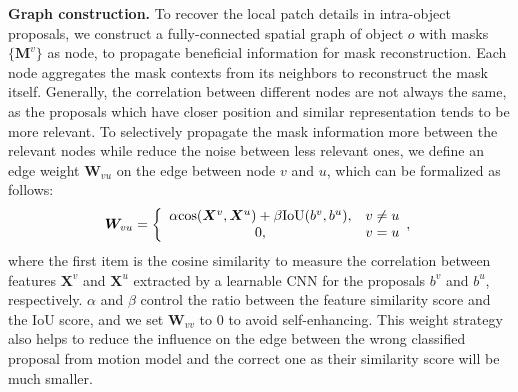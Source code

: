 \documentclass[letterpaper]{article} %
\begin{document}
\noindent \textbf{Graph construction.}
To recover the local patch details in intra-object proposals, we construct a fully-connected spatial graph of object $o$ with masks $\{\bm{M}^{v}\}$ as node, to propagate beneficial information for mask reconstruction. Each node aggregates the mask contexts from its neighbors to reconstruct the mask itself. Generally, the correlation between different nodes are not always the same, as the proposals which have closer position and similar representation tends to be more relevant.
To selectively propagate the mask information more between the relevant nodes while reduce the noise between less relevant ones, we define an edge weight $\bm{W}_{vu}$ on the edge between node $v$ and $u$, which can be formalized as follows:
\begin{equation}
    \bm{W}_{vu} = \left\{
             \begin{array}{cl}
              \alpha {\rm cos}(\bm{X}^v, \bm{X}^u)+\beta  \text{IoU}(b^{v}, b^{u}),  & v \neq u  \\
              0,  & v = u  \\
             \end{array},
\right.
\label{eq:alpha}
\end{equation}
where the first item is the cosine similarity to measure the correlation between features $\bm{X}^v$ and $\bm{X}^u$ extracted by a learnable CNN for the proposals $b^v$ and $b^u$, respectively. $\alpha$ and $\beta$ control the ratio between the feature similarity score and the IoU score, and we set $\bm{W}_{vv}$ to 0 to avoid self-enhancing. This weight strategy also helps to reduce the influence on the edge between the wrong classified proposal from motion model and the correct one as their similarity score will be much smaller.
\end{document}
